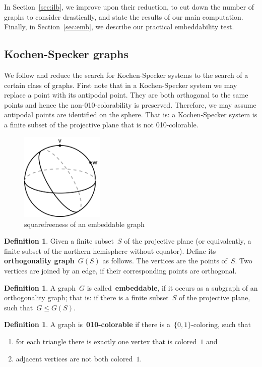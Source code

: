 \documentclass[adraft,copyright,creativecommons]{eptcs}
\newcommand{\keyword}[1]{\textbf{#1}}
\newcounter{main}
\theoremstyle{definition}
\newtheorem{dfn}[main]{Definition}
\theoremstyle{remark}
\begin{document}
In Section~\ref{sec:ilb},
we improve upon their reduction,
to cut down the number of graphs to consider drastically,
and state the results of our main computation.
Finally, in Section~\ref{sec:emb},
we describe our practical embeddability test.

\subsection{Kochen-Specker graphs}
\label{sec:ksgraphs}
We follow \cite{aow11} and reduce the search for Kochen-Specker systems
to the search of a certain class of graphs.
First note that in a Kochen-Specker system we may replace a point with its
antipodal point.  They are both orthogonal to the same points and hence
the non-010-colorability is preserved.
Therefore, we may assume antipodal points are identified on the sphere.
That is: a Kochen-Specker system is a finite subset of the projective plane
that is not 010-colorable.
\begin{figure}
\begin{center}
\includegraphics[width=40mm]{../graphs/kruisproduct.pdf}
\end{center}
\caption{squarefreeness of an embeddable graph
\label{fig:crossproduct}}
\end{figure}
\begin{dfn}
Given a finite subset~$S$ of the projective plane
(or equivalently, a finite subset of the northern
hemisphere without equator).
Define its \keyword{orthogonality graph}~$G(S)$ as follows.
The vertices are the points of~$S$.
Two vertices are joined by an edge, if their corresponding points
are orthogonal.
\end{dfn}
\begin{dfn}
A graph~$G$ is called~\keyword{embeddable},
if it occurs as a subgraph of an orthogonality graph;
that is: if there is a finite subset~$S$ of the projective plane,
such that~$G \leq G(S)$.
\end{dfn}
\begin{dfn}
A graph is~\keyword{010-colorable}
if there is a~$\{0,1\}$-coloring, such that
\begin{enumerate}
\item
for each triangle there is exactly one vertex that is colored~$1$ and
\item
adjacent vertices are not both colored~$1$.
\end{enumerate}
\end{dfn}
\end{document}
